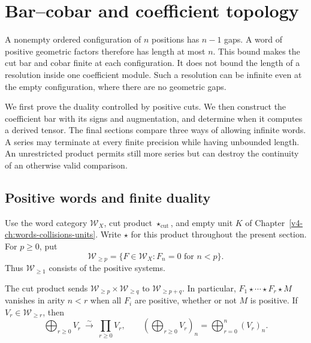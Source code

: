 \chapter{Bar--cobar and coefficient topology}
\label{v4-ch:bar-cobar-topology}

A nonempty ordered configuration of \(n\) positions has \(n-1\) gaps.
A word of positive geometric factors therefore has length at most
\(n\). This bound makes the cut bar and cobar finite at each
configuration. It does not bound the length of a resolution inside
one coefficient module. Such a resolution can be infinite even at
the empty configuration, where there are no geometric gaps.

We first prove the duality controlled by positive cuts. We then
construct the coefficient bar with its signs and augmentation,
and determine when it computes a derived tensor. The final sections
compare three ways of allowing infinite words. A series may
terminate at every finite precision while having unbounded length.
An unrestricted product permits still more series but can destroy
the continuity of an otherwise valid comparison.

\section{Positive words and finite duality}
\label{v4-sec:bar-positive}

Use the word category \(\mathcal W_X\), cut product
\(\star_{\mathrm{cut}}\), and empty unit \(K\) of
Chapter~\ref{v4-ch:words-collisions-units}. Write \(\star\) for this
product throughout the present section. For \(p\geq0\), put
\[
 \mathcal W_{\geq p}=\{F\in\mathcal W_X:F_n=0\text{ for }n<p\}.
\]
Thus \(\mathcal W_{\geq1}\) consists of the positive systems.

\begin{lemma}\label{v4-lem:bar-finite-words}
The cut product sends
\(\mathcal W_{\geq p}\times\mathcal W_{\geq q}\) to
\(\mathcal W_{\geq p+q}\). In particular,
\(F_1\star\cdots\star F_r\star M\) vanishes in arity \(n<r\)
when all \(F_i\) are positive, whether or not \(M\) is positive.
If \(V_r\in\mathcal W_{\geq r}\), then
\[
 \bigoplus_{r\geq0}V_r\ \xrightarrow{\sim}\ \prod_{r\geq0}V_r,
 \qquad
 \left(\bigoplus_{r\geq0}V_r\right)_n
       =\bigoplus_{r=0}^n(V_r)_n.
\]
\end{lemma}

